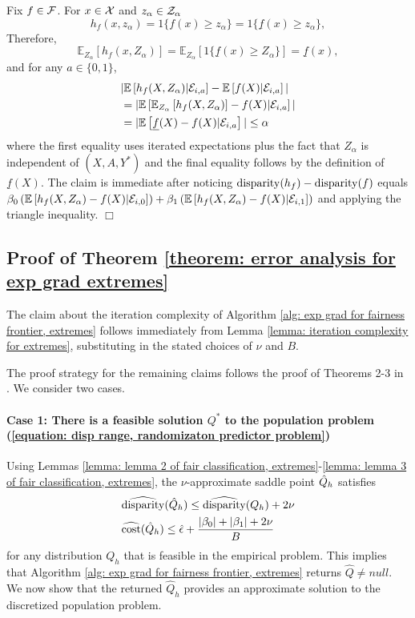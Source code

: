 \documentclass{article}
\begin{document}
Fix $f \in \mathcal{F}$. For $x \in \mathcal{X}$ and $z_{\alpha} \in \mathcal{Z}_{\alpha}$
    \[
    h_f(x, z_{\alpha})  = 1\{f(x) \geq z_\alpha\} = 1\{ \underline{f}(x) \geq z_\alpha\},
    \]
Therefore,
    \[
    \mathbb{E}_{Z_\alpha}\left[ h_f(x, Z_\alpha) \right] = \mathbb{E}_{Z_\alpha}\left[ 1\{\underline{f}(x) \geq Z_\alpha\} \right] = \underline{f}(x),
    \]
and for any $a \in \{0, 1\}$,
    \begin{align*}
    & | \mathbb{E}\left[ h_f(X, Z_\alpha) | \mathcal{E}_{i,a} \right] - \mathbb{E}\left[ f(X) | \mathcal{E}_{i,a} \right] | \\
    &= | \mathbb{E}\left[ \mathbb{E}_{Z_\alpha}\left[ h_f(X, Z_\alpha) \right] - f(X) | \mathcal{E}_{i,a} \right] | \\
    &= | \mathbb{E}\left[ \underline{f}(X) - f(X) | \mathcal{E}_{i,a} \right] | \leq \alpha
    \end{align*}
where the first equality uses iterated expectations plus the fact that $Z_\alpha$ is independent of $(X, A, Y^*)$ and the final equality follows by the definition of $\underline{f}(X)$. The claim is immediate after noticing $\operatorname{disparity}(h_f) - \operatorname{disparity}(f)$ equals $\beta_0 \left( \mathbb{E}\left[ h_f(X, Z_\alpha) - f(X) | \mathcal{E}_{i,0} \right] \right) + \beta_1 \left( \mathbb{E}\left[ h_f(X, Z_\alpha) - f(X) | \mathcal{E}_{i,1} \right] \right)$ and applying the triangle inequality. $\Box$

\subsection*{Proof of Theorem \ref{theorem: error analysis for exp grad extremes}} 

The claim about the iteration complexity of Algorithm \ref{alg: exp grad for fairness frontier, extremes} follows immediately from Lemma \ref{lemma: iteration complexity for extremes}, substituting in the stated choices of $\nu$ and $B$. 

The proof strategy for the remaining claims follows the proof of Theorems 2-3 in \cite{AgarwalEtAl(19)-FairRegression}. We consider two cases.
    
\paragraph{Case 1: There is a feasible solution $Q^*$ to the population problem (\ref{equation: disp range, randomizaton predictor problem})} 
    
Using Lemmas \ref{lemma: lemma 2 of fair classification, extremes}-\ref{lemma: lemma 3 of fair classification, extremes}, the $\nu$-approximate saddle point $\hat{Q}_h$ satisfies
    \begin{align}
        & \widehat{\operatorname{disparity}}(\hat{Q}_h) \leq \widehat{\operatorname{disparity}}(Q_h) + 2\nu \\
        & \widehat{\operatorname{cost}}(\hat{Q}_h) \leq \hat{\epsilon} + \frac{ |\beta_0|+ |\beta_1| + 2\nu }{B}
    \end{align}
for any distribution $Q_h$ that is feasible in the empirical problem. This implies that Algorithm \ref{alg: exp grad for fairness frontier, extremes} returns $\hat{Q} \neq null$. We now show that the returned $\hat{Q}_h$ provides an approximate solution to the discretized population problem.
    
\end{document}
